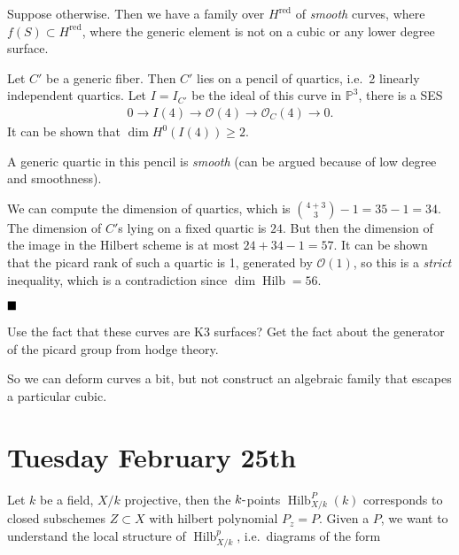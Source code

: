 Suppose otherwise. Then we have a family over \(H^\operatorname{red}\)
of \emph{smooth} curves, where \(f(S) \subset H^\operatorname{red}\),
where the generic element is not on a cubic or any lower degree surface.

Let \(C'\) be a generic fiber. Then \(C'\) lies on a pencil of quartics,
i.e.~2 linearly independent quartics. Let \(I = I_{C'}\) be the ideal of
this curve in \({\mathbb{P}}^3\), there is a SES
\begin{align*}
0\to I(4) \to {\mathcal{O}}(4) \to {\mathcal{O}}_C(4) \to 0
.\end{align*}
It can be shown that \(\dim H^0(I(4)) \geq 2\).

\begin{description}
\tightlist
\item[Fact]
A generic quartic in this pencil is \emph{smooth} (can be argued because
of low degree and smoothness).
\end{description}

We can compute the dimension of quartics, which is
\({4+3 \choose 3} - 1 = 35 - 1 = 34\). The dimension of \(C'\)s lying on
a fixed quartic is \(24\). But then the dimension of the image in the
Hilbert scheme is at most \(24 + 34 - 1 = 57\). It can be shown that the
picard rank of such a quartic is 1, generated by \({\mathcal{O}}(1)\),
so this is a \emph{strict} inequality, which is a contradiction since
\(\dim \operatorname{Hilb}= 56\).

\(\hfill\blacksquare\)

Use the fact that these curves are K3 surfaces? Get the fact about the
generator of the picard group from hodge theory.

So we can deform curves a bit, but not construct an algebraic family
that escapes a particular cubic.

\hypertarget{tuesday-february-25th}{%
\section{Tuesday February 25th}\label{tuesday-february-25th}}

Let \(k\) be a field, \(X/k\) projective, then the \(k{\hbox{-}}\)points
\(\operatorname{Hilb}_{X/k}^P(k)\) corresponds to closed subschemes
\(Z\subset X\) with hilbert polynomial \(P_z = P\). Given a \(P\), we
want to understand the local structure of
\(\operatorname{Hilb}_{X/k}^p\), i.e.~diagrams of the form

